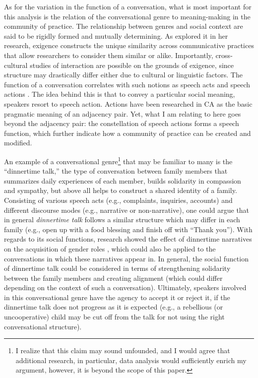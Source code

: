 \documentclass[12pt, draft]{article}
\begin{document}
As for the variation in the function of a conversation, what is most important for this analysis is the relation of the conversational genre to meaning-making in the community of practice. The relationship between genres and social context are said to be rigidly formed and mutually determining. As \textcite{mayes2005} explored it in her research, exigence constructs the unique similarity across communicative practices that allow researchers to consider them similar or alike. Importantly, cross-cultural studies of interaction are possible on the grounds of exigence, since structure may drastically differ either due to cultural or linguistic factors. The function of a conversation correlates with such notions as speech acts \parencite{searle2011} and speech actions \parencite{levinson2013}. The idea behind this is that to convey a particular social meaning, speakers resort to speech action. Actions have been researched in CA as the basic pragmatic meaning of an adjacency pair. Yet, what I am relating to here goes beyond the adjacency pair: the constellation of speech actions forms a speech function, which further indicate how a community of practice can be created and modified.

An example of a conversational genre\footnote{I realize that this claim may sound unfounded, and I would agree that additional research, in particular, data analysis would sufficiently enrich my argument, however, it is beyond the scope of this paper.} that may be familiar to many is the ``dinnertime talk,'' the type of conversation between family members that summarizes daily experiences of each member, builds solidarity in compassion and sympathy, but above all helps to construct a shared identity of a family. Consisting of various speech acts (e.g., complaints, inquiries, accounts) and different discourse modes (e.g., narrative or non-narrative), one could argue that in general \textit{dinnertime talk} follows a similar structure which may differ in each family (e.g., open up with a food blessing and finish off with ``Thank you''). With regards to its social functions, research showed the effect of dinnertime narratives on the acquisition of gender roles \parencite{ochs2001}, which could also be applied to the conversations in which these narratives appear in. In general, the social function of dinnertime talk could be considered in terms of strengthening solidarity between the family members and creating alignment (which could differ depending on the context of such a conversation). Ultimately, speakers involved in this conversational genre have the agency to accept it or reject it, if the dinnertime talk does not progress as it is expected (e.g., a rebellious (or uncooperative) child may be cut off from the talk for not using the right conversational structure). 
\end{document}
